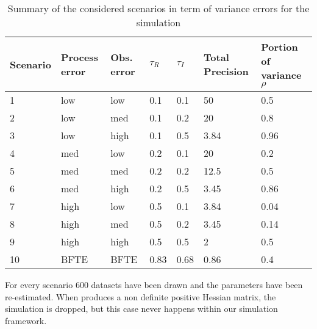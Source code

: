 \begin{table}[htbp]

\begin{center}
\begin{tabular}[t]{lllllll}
Scenario & Process error & Obs. error & $\tau_R$ & $\tau_I$ & Total Precision & Portion of variance $\rho$ \\ \hline
1 & low & low & 0.1 & 0.1 & 50 & 0.5\\
2 & low & med & 0.1 & 0.2 & 20 & 0.8 \\ 
3 & low & high & 0.1 & 0.5 & 3.84 & 0.96 \\ 
4 & med & low & 0.2 & 0.1 & 20 & 0.2\\
5 & med & med & 0.2 & 0.2 & 12.5 & 0.5 \\ 
6 & med & high & 0.2 & 0.5 & 3.45 & 0.86 \\ 
7 & high & low & 0.5 & 0.1 & 3.84 & 0.04\\
8 & high & med & 0.5 & 0.2 & 3.45 & 0.14 \\ 
9 & high & high & 0.5 & 0.5 & 2 & 0.5 \\ 
10 & BFTE & BFTE & 0.83 & 0.68 & 0.86 & 0.4\\ 
\end{tabular}
\end{center}
\caption{Summary of the considered scenarios in term of variance errors for the simulation }
\end{table}


For every scenario 600 datasets have been drawn and the parameters have been re-estimated. When \iscam produces a non definite positive Hessian matrix, the simulation is dropped, but this case never happens within our simulation framework.

